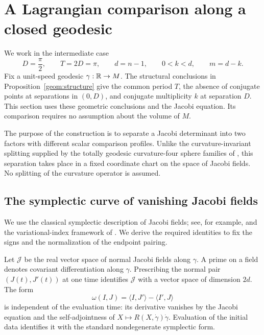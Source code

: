 \section{A Lagrangian comparison along a closed geodesic}
\label{sec:lagrangian}

We work in the intermediate case
\[
 D=\frac{\pi}{2},\qquad T=2D=\pi,\qquad
 d=n-1,\qquad 0<k<d,\qquad m=d-k.
\]
Fix a unit-speed geodesic $\gamma:\mathbb R\to M$.  The structural conclusions
in Proposition~\ref{geom:structure} give the common period $T$, the absence of
conjugate points at separations in $(0,D)$, and conjugate multiplicity
$k$ at separation $D$.  This section uses these geometric conclusions
and the Jacobi equation.  Its comparison requires no assumption about
the volume of $M$.

The purpose of the construction is to separate a Jacobi determinant
into two factors with different scalar comparison profiles.  Unlike
the curvature-invariant splitting supplied by the totally geodesic
curvature-four sphere families of
\citet[Theorem~26]{RovenskiiToponogov1996}, this separation takes place
in a fixed coordinate chart on the space of Jacobi fields.  No
splitting of the curvature operator is assumed.

\subsection{The symplectic curve of vanishing Jacobi fields}

We use the classical symplectic description of Jacobi fields;
see, for example, \citet[Sections~2.1.2 and~10.5.2]{Zelditch2017Notes}
and the variational-index framework of \citet{Duistermaat1976}.
We derive the required identities to fix the signs and the
normalization of the endpoint pairing.

Let $\mathcal J$ be the real vector space of normal Jacobi fields along
$\gamma$.  A prime on a field denotes covariant differentiation along
$\gamma$.  Prescribing the normal pair $(J(t),J'(t))$ at one time
identifies $\mathcal J$ with a vector space of dimension $2d$.  The form
\begin{equation}
 \omega(I,J)=\langle I,J'\rangle-\langle I',J\rangle
 \label{eq:lag-wronskian}
\end{equation}
is independent of the evaluation time: its derivative vanishes by the
Jacobi equation and the self-adjointness of
$X\mapsto R(X,\dot\gamma)\dot\gamma$.  Evaluation of the initial data
identifies it with the standard nondegenerate symplectic form.

